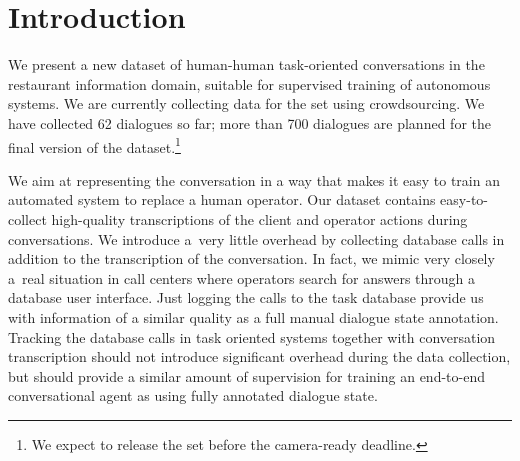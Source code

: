 \documentclass[runningheads,a4paper]{llncs}
\begin{document}
\section{Introduction}\label{sec:intro}
\vspace{-0.50em}
We present a new dataset of human-human task-oriented conversations in the restaurant information domain, suitable for supervised training of autonomous systems. 
We are currently collecting data for the set using crowdsourcing. We have collected 62 dialogues so far; more than 700 dialogues are planned for the final version of the dataset.\footnote{We expect to release the set before the camera-ready deadline.}

We aim at representing the conversation in a way that makes it easy to train an automated system to replace a human operator. 
Our dataset contains easy-to-collect high-quality transcriptions of the client and operator actions during conversations.
We introduce a~very little overhead by collecting database calls in addition to the transcription of the conversation.
In fact, we mimic very closely a~real situation in call centers where operators search for answers through a database user interface. 
Just logging the calls to the task database provide us with information of a similar quality as a full manual dialogue state annotation.
Tracking the database calls in task oriented systems together with conversation transcription should not introduce significant overhead during the data collection, but should provide a similar amount of supervision for training an end-to-end conversational agent as using fully annotated dialogue state.
\end{document}
